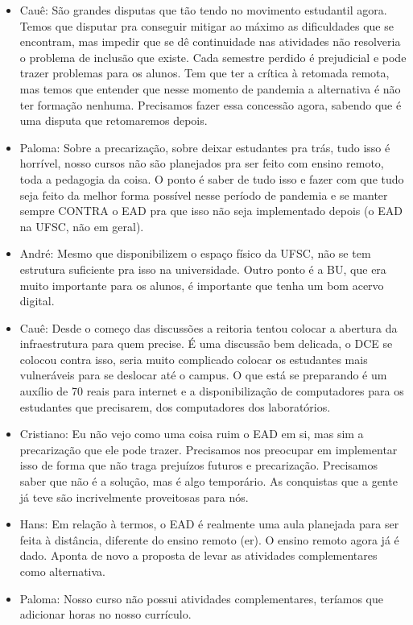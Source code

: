 \documentclass{ata-calico}
\begin{document}
\begin{itemize}
\item Cauê: São grandes disputas que tão tendo no movimento estudantil agora. Temos que disputar pra conseguir mitigar ao máximo as dificuldades que se encontram, mas impedir que se dê continuidade nas atividades não resolveria o problema de inclusão que existe. Cada semestre perdido é prejudicial e pode trazer problemas para os alunos. Tem que ter a crítica à retomada remota, mas temos que entender que nesse momento de pandemia a alternativa é não ter formação nenhuma. Precisamos fazer essa concessão agora, sabendo que é uma disputa que retomaremos depois.
\item Paloma: Sobre a precarização, sobre deixar estudantes pra trás, tudo isso é horrível, nosso cursos não são planejados pra ser feito com ensino remoto, toda a pedagogia da coisa. O ponto é saber de tudo isso e fazer com que tudo seja feito da melhor forma possível nesse período de pandemia e se manter sempre CONTRA o EAD pra que isso não seja implementado depois (o EAD na UFSC, não em geral).
\item André: Mesmo que disponibilizem o espaço físico da UFSC, não se tem estrutura suficiente pra isso na universidade. Outro ponto é a BU, que era muito importante para os alunos, é importante que tenha um bom acervo digital.
\item Cauê: Desde o começo das discussões a reitoria tentou colocar a abertura da infraestrutura para quem precise. É uma discussão bem delicada, o DCE se colocou contra isso, seria muito complicado colocar os estudantes mais vulneráveis para se deslocar até o campus. O que está se preparando é um auxílio de 70 reais para internet e a disponibilização de computadores para os estudantes que precisarem, dos computadores dos laboratórios.
\item Cristiano: Eu não vejo como uma coisa ruim o EAD em si, mas sim a precarização que ele pode trazer. Precisamos nos preocupar em implementar isso de forma que não traga prejuízos futuros e precarização. Precisamos saber que não é a solução, mas é algo temporário. As conquistas que a gente já teve são incrivelmente proveitosas para nós.
\item Hans: Em relação à termos, o EAD é realmente uma aula planejada para ser feita à distância, diferente do ensino remoto (er). O ensino remoto agora já é dado. Aponta de novo a proposta de levar as atividades complementares como alternativa.
\item Paloma: Nosso curso não possui atividades complementares, teríamos que adicionar horas no nosso currículo.

\end{itemize}
\end{document}
